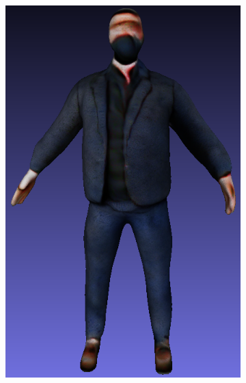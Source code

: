 \begin{figure}[ht]
\begin{subfigure}[b]{0.175\textwidth}
        \includegraphics[width=\textwidth]{figures/appendix/bias_poor_genie_4.png}
        \caption{}
    \end{subfigure}


\end{figure}
